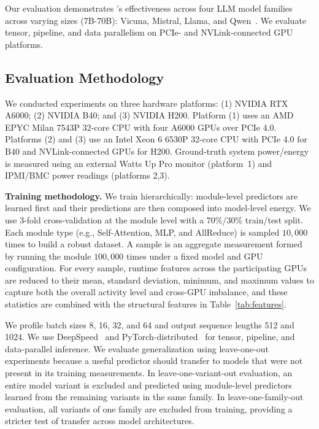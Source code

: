 



Our evaluation demonstrates \sys{}'s effectiveness across four LLM model families across varying sizes (7B-70B): Vicuna, Mistral, Llama, and Qwen~\cite{vicuna, jiang2023mistral7b, touvron2023llama, qwen}.
We evaluate tensor, pipeline, and data parallelism on PCIe- and NVLink-connected GPU platforms.

\subsection{Evaluation Methodology}
\label{ss:esetup}
We conducted experiments on three hardware platforms:
(1) NVIDIA RTX A6000;
(2) NVIDIA B40; and
(3) NVIDIA H200.
Platform (1) uses an AMD EPYC Milan 7543P 32-core CPU with four A6000 GPUs over PCIe 4.0. Platforms (2) and (3) use an Intel Xeon 6 6530P 32-core CPU with PCIe 4.0 for B40 and NVLink-connected GPUs for H200.
Ground-truth system power/energy is measured using an external Watts Up Pro monitor (platform~1) and IPMI/BMC power readings (platforms 2,3).

\smallskip\noindent\textbf{Training methodology.} We train \sys{} hierarchically: module-level predictors are learned first and their predictions are then composed into model-level energy. We use 3-fold cross-validation at the module level with a 70\%/30\% train/test split. Each module type (e.g., Self-Attention, MLP, and AllReduce) is sampled $10{,}000$ times to build a robust dataset. A sample is an aggregate measurement formed by running the module $100{,}000$ times under a fixed model and GPU configuration. For every sample, runtime features across the participating GPUs are reduced to their mean, standard deviation, minimum, and maximum values to capture both the overall activity level and cross-GPU imbalance, and these statistics are combined with the structural features in Table~\ref{tab:features}.

We profile batch sizes 8, 16, 32, and 64 and output sequence lengths 512 and 1024. We use DeepSpeed~\cite{deepspeed} and PyTorch-distributed~\cite{torch-distributed} for tensor, pipeline, and data-parallel inference. 
We evaluate generalization using leave-one-out experiments because a useful predictor should transfer to models that were not present in its training measurements. In leave-one-variant-out evaluation, an entire model variant is excluded and predicted using module-level predictors learned from the remaining variants in the same family. In leave-one-family-out evaluation, all variants of one family are excluded from training, providing a stricter test of transfer across model architectures.

